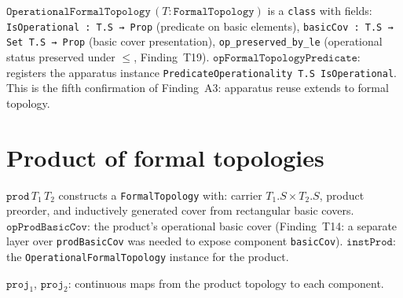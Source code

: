 \begin{definition}
\label{def:OperationalFormalTopology}
\leanok
{}
$\texttt{OperationalFormalTopology}\,(T : \texttt{FormalTopology})$ is a
\texttt{class} with fields: \texttt{IsOperational : T.S → Prop} (predicate on
basic elements), \texttt{basicCov : T.S → Set T.S → Prop} (basic cover
presentation), \texttt{op\_preserved\_by\_le} (operational status preserved under
$\le$, Finding~T19).
$\texttt{opFormalTopologyPredicate}$: registers the apparatus instance
\texttt{PredicateOperationality T.S IsOperational}.
This is the fifth confirmation of Finding~A3: apparatus reuse extends to formal topology.
\end{definition}

\section{Product of formal topologies}
\label{sec:topology_product}

\begin{definition}
\label{def:prod_topology}
\leanok
{}
$\texttt{prod}\,T_1\,T_2$ constructs a \texttt{FormalTopology} with:
carrier $T_1.S \times T_2.S$, product preorder, and inductively generated
cover from rectangular basic covers.
$\texttt{opProdBasicCov}$: the product's operational basic cover
(Finding~T14: a separate layer over \texttt{prodBasicCov} was needed
to expose component \texttt{basicCov}).
$\texttt{instProd}$: the \texttt{OperationalFormalTopology} instance for
the product.
\end{definition}

\begin{definition}[Projections]
\label{def:topology_proj}
\leanok
{}
$\texttt{proj}_1$, $\texttt{proj}_2$: continuous maps from the product
topology to each component.
\end{definition}

